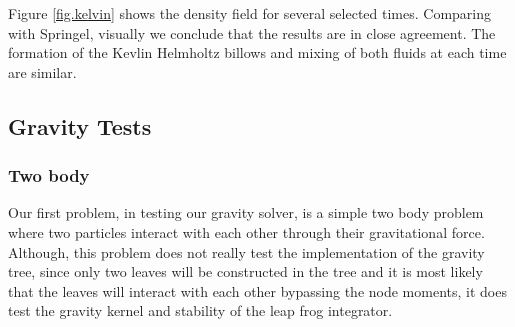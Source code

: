 Figure \ref{fig.kelvin} shows the density field for several selected times. Comparing with
Springel, visually we conclude that the results are in close agreement. The formation of the
Kevlin Helmholtz billows and mixing of both fluids at each time are similar.

\subsection{Gravity Tests}
\subsubsection{Two body}
Our first problem, in testing our gravity solver, is a simple two body problem where two particles
interact with each other through their gravitational force. Although, this problem does not really test the 
implementation of the gravity tree, since only two leaves will be constructed
in the tree and it is most likely that the leaves will interact with each other bypassing the node 
moments, it does test the gravity kernel and stability of the leap frog integrator.

